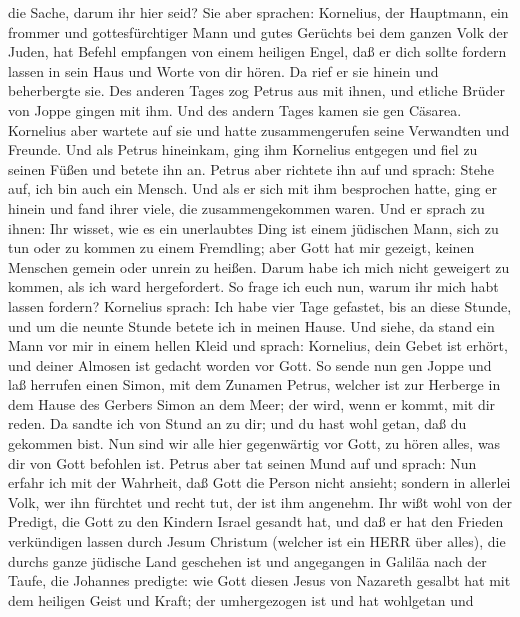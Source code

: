 die Sache, darum ihr hier seid?  Sie aber sprachen:
Kornelius, der Hauptmann, ein frommer und gottesfürchtiger Mann und
gutes Gerüchts bei dem ganzen Volk der Juden, hat Befehl empfangen von
einem heiligen Engel, daß er dich sollte fordern lassen in sein Haus und
Worte von dir hören.  Da rief er sie hinein und beherbergte
sie. Des anderen Tages zog Petrus aus mit ihnen, und etliche Brüder von
Joppe gingen mit ihm.  Und des andern Tages kamen sie gen
Cäsarea. Kornelius aber wartete auf sie und hatte zusammengerufen seine
Verwandten und Freunde.  Und als Petrus hineinkam, ging ihm
Kornelius entgegen und fiel zu seinen Füßen und betete ihn an.
 Petrus aber richtete ihn auf und sprach: Stehe auf, ich
bin auch ein Mensch.  Und als er sich mit ihm besprochen
hatte, ging er hinein und fand ihrer viele, die zusammengekommen waren.
 Und er sprach zu ihnen: Ihr wisset, wie es ein unerlaubtes
Ding ist einem jüdischen Mann, sich zu tun oder zu kommen zu einem
Fremdling; aber Gott hat mir gezeigt, keinen Menschen gemein oder unrein
zu heißen.  Darum habe ich mich nicht geweigert zu kommen,
als ich ward hergefordert. So frage ich euch nun, warum ihr mich habt
lassen fordern?  Kornelius sprach: Ich habe vier Tage
gefastet, bis an diese Stunde, und um die neunte Stunde betete ich in
meinen Hause. Und siehe, da stand ein Mann vor mir in einem hellen Kleid
 und sprach: Kornelius, dein Gebet ist erhört, und deiner
Almosen ist gedacht worden vor Gott.  So sende nun gen
Joppe und laß herrufen einen Simon, mit dem Zunamen Petrus, welcher ist
zur Herberge in dem Hause des Gerbers Simon an dem Meer; der wird, wenn
er kommt, mit dir reden.  Da sandte ich von Stund an zu
dir; und du hast wohl getan, daß du gekommen bist. Nun sind wir alle
hier gegenwärtig vor Gott, zu hören alles, was dir von Gott befohlen
ist.  Petrus aber tat seinen Mund auf und sprach: Nun
erfahr ich mit der Wahrheit, daß Gott die Person nicht ansieht;
 sondern in allerlei Volk, wer ihn fürchtet und recht tut,
der ist ihm angenehm.  Ihr wißt wohl von der Predigt, die
Gott zu den Kindern Israel gesandt hat, und daß er hat den Frieden
verkündigen lassen durch Jesum Christum (welcher ist ein HERR über
alles),  die durchs ganze jüdische Land geschehen ist und
angegangen in Galiläa nach der Taufe, die Johannes predigte:
 wie Gott diesen Jesus von Nazareth gesalbt hat mit dem
heiligen Geist und Kraft; der umhergezogen ist und hat wohlgetan und
